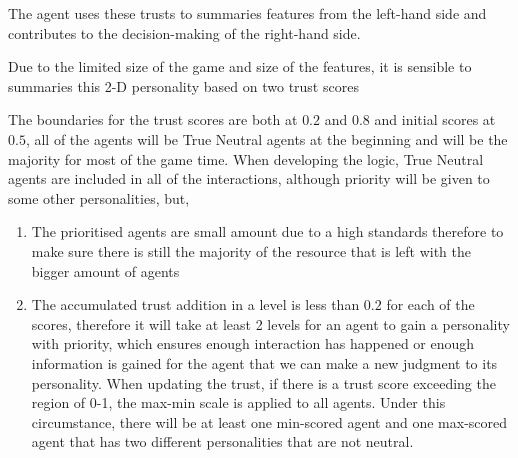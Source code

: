 The agent uses these trusts to summaries features from the left-hand side and contributes to the decision-making of the right-hand side.

Due to the limited size of the game and size of the features, it is sensible to summaries this 2-D personality based on two trust scores

The boundaries for the trust scores are both at $0.2$ and $0.8$ and initial scores at $0.5$, all of the agents will be True Neutral agents at the beginning and will be the majority for most of the game time. When developing the logic, True Neutral agents are included in all of the interactions, although priority will be given to some other personalities, but,
\begin{enumerate}
    \item The prioritised agents are small amount due to a high standards therefore to make sure there is still the majority of the resource that is left with the bigger amount of agents
    \item The accumulated trust addition in a level is less than $0.2$ for each of the scores, therefore it will take at least 2 levels for an agent to gain a personality with priority, which ensures enough interaction has happened or enough information is gained for the agent that we can make a new judgment to its personality. When updating the trust, if there is a trust score exceeding the region of 0-1, the max-min scale is applied to all agents. Under this circumstance, there will be at least one min-scored agent and one max-scored agent that has two different personalities that are not neutral.
\end{enumerate}

\newpage

